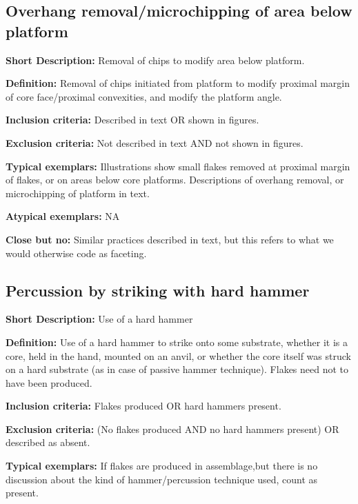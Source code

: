 \documentclass[
]{article}
\begin{document}
\hypertarget{overhang-removalmicrochipping-of-area-below-platform}{%
\subsection{Overhang removal/microchipping of area below
platform}\label{overhang-removalmicrochipping-of-area-below-platform}}

\textbf{Short Description:} Removal of chips to modify area below
platform.

\textbf{Definition:} Removal of chips initiated from platform to modify
proximal margin of core face/proximal convexities, and modify the
platform angle.

\textbf{Inclusion criteria:} Described in text OR shown in figures.

\textbf{Exclusion criteria:} Not described in text AND not shown in
figures.

\textbf{Typical exemplars:} Illustrations show small flakes removed at
proximal margin of flakes, or on areas below core platforms.
Descriptions of overhang removal, or microchipping of platform in text.

\textbf{Atypical exemplars:} NA

\textbf{Close but no:} Similar practices described in text, but this
refers to what we would otherwise code as faceting.

\hypertarget{percussion-by-striking-with-hard-hammer}{%
\subsection{Percussion by striking with hard
hammer}\label{percussion-by-striking-with-hard-hammer}}

\textbf{Short Description:} Use of a hard hammer

\textbf{Definition:} Use of a hard hammer to strike onto some substrate,
whether it is a core, held in the hand, mounted on an anvil, or whether
the core itself was struck on a hard substrate (as in case of passive
hammer technique). Flakes need not to have been produced.

\textbf{Inclusion criteria:} Flakes produced OR hard hammers present.

\textbf{Exclusion criteria:} (No flakes produced AND no hard hammers
present) OR described as absent.

\textbf{Typical exemplars:} If flakes are produced in assemblage,but
there is no discussion about the kind of hammer/percussion technique
used, count as present.
\end{document}

